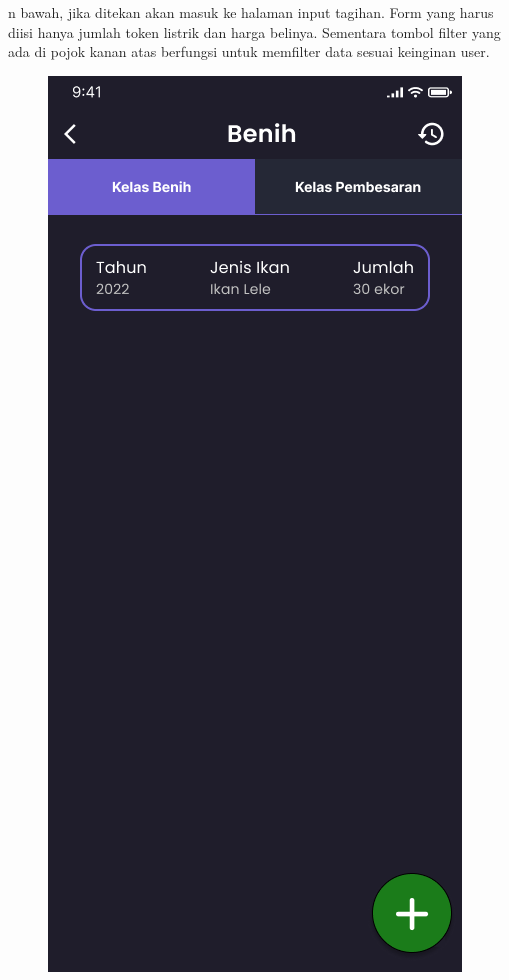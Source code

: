 \begin{spacing}{1.5}
n bawah, jika ditekan akan masuk ke halaman input tagihan. Form yang harus diisi hanya jumlah token listrik dan harga belinya. Sementara tombol filter yang ada di pojok kanan atas berfungsi untuk memfilter data sesuai keinginan user.

	\begin{figure}[H]
			\includegraphics[width=\linewidth]{gambar/sprint1/mockup_detail_seed.png}

\end{figure}
\end{spacing}
